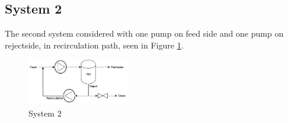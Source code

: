 \subsection{System 2}
The second system considered with one pump on feed side and one pump on rejectside, in recirculation path, seen in Figure \ref{fig:Sys2}.
\begin{figure}[h]
    \centering
    \includegraphics[width=0.4\textwidth]{Sys2}
    \caption{System 2}
    \label{fig:Sys2}
\end{figure}

